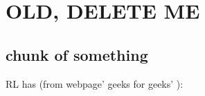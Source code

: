 






\newpage
\section{OLD, DELETE ME}

\subsection{chunk of something}
RL has (from webpage' geeks for geeks' \cite{GeeksforGeeks2018RL}):  

